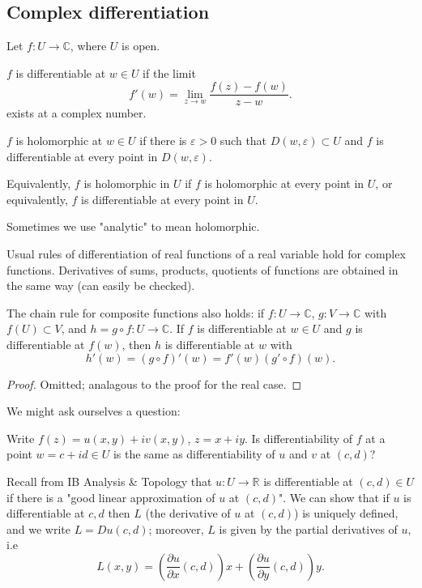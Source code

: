 \documentclass[a4paper]{scrartcl}
\begin{document}
\subsection{Complex differentiation}
Let $f: U \rightarrow \mathbb{C}$, where $U$ is open. 
\begin{definition*}[Differentiability]
     $f$ is differentiable at $w \in U$ if the limit \[
     f' (w)=\lim_{z \rightarrow w} \frac{f (z)-f (w)}{z-w}
     .\] exists at a complex number.
\end{definition*}
\begin{definition*}
     $f$ is holomorphic at $w \in U$ if there is $\varepsilon >0$ such that $D (w, \varepsilon)\subset U$ and $f$ is differentiable at every point in $D (w, \varepsilon)$. 

     Equivalently, $f$ is holomorphic in $U$ if $f$ is holomorphic at every point in $U$, or equivalently, $f$ is differentiable at every point in $U$.
\end{definition*}
\begin{remark}
     Sometimes we use "analytic" to mean holomorphic.
\end{remark}
Usual rules of differentiation of real functions of a real variable hold for complex functions. Derivatives of sums, products, quotients of functions are obtained in the same way (can easily be checked). 

\begin{proposition}
     The chain rule for composite functions also holds: if $f: U \rightarrow \mathbb{C}$, $g: V \rightarrow \mathbb{C}$ with $f (U) \subset V$, and $h= g \circ f : U \rightarrow \mathbb{C}$. If $f$ is differentiable at $w \in U$ and $g$ is differentiable at $f (w)$, then $h$ is differentiable at $w$ with \[
     h' (w)=(g \circ f)' (w)= f' (w) (g' \circ f)(w)
     .\] 
\end{proposition}
\begin{proof}
     Omitted; analagous to the proof for the real case.
\end{proof}
We might ask ourselves a question: 

Write $f (z)= u (x,y)+iv (x,y)$, $z=x+iy$. Is differentiability of $f$ at a point $w=c+id \in U$ is the same as differentiability of $u $ and $v$ at $(c,d)$? 

Recall from IB Analysis \& Topology that $u : U \rightarrow \mathbb{R}$ is differentiable at $(c,d) \in U$ if there is a "good linear approximation of $u$ at $(c,d)$". We can show that if  $u$ is differentiable at $c,d$ then $L$ (the derivative of $u$ at $(c,d)$) is uniquely defined, and we write $L=Du (c,d)$; moreover, $L$ is given by the partial derivatives of $u$, i.e \[
L (x,y)= \left(\frac{\partial u}{\partial x} (c,d)\right)x + \left( \frac{\partial u}{\partial y}(c,d)\right)y
.\]  
\end{document}
